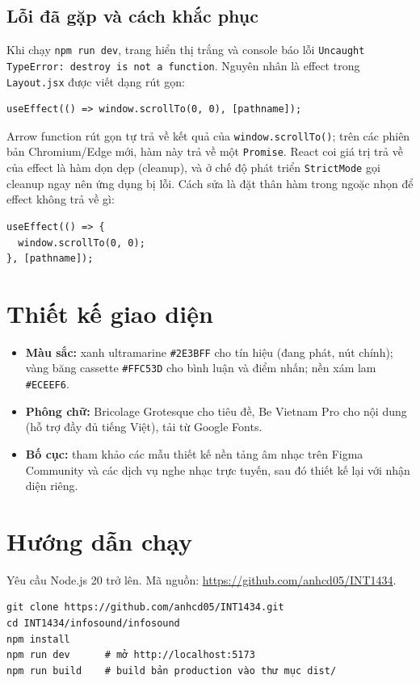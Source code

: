 \documentclass[12pt,a4paper]{article}
\begin{document}
\subsection{Lỗi đã gặp và cách khắc phục}

Khi chạy \texttt{npm run dev}, trang hiển thị trắng và console báo lỗi \texttt{Uncaught TypeError: destroy is not a function}. Nguyên nhân là effect trong \texttt{Layout.jsx} được viết dạng rút gọn:

\begin{verbatim}
useEffect(() => window.scrollTo(0, 0), [pathname]);
\end{verbatim}

Arrow function rút gọn tự trả về kết quả của \texttt{window.scrollTo()}; trên các phiên bản Chromium/Edge mới, hàm này trả về một \texttt{Promise}. React coi giá trị trả về của effect là hàm dọn dẹp (cleanup), và ở chế độ phát triển \texttt{StrictMode} gọi cleanup ngay nên ứng dụng bị lỗi. Cách sửa là đặt thân hàm trong ngoặc nhọn để effect không trả về gì:

\begin{verbatim}
useEffect(() => {
  window.scrollTo(0, 0);
}, [pathname]);
\end{verbatim}

\section{Thiết kế giao diện}

\begin{itemize}
  \item \textbf{Màu sắc:} xanh ultramarine \texttt{\#2E3BFF} cho tín hiệu (đang phát, nút chính); vàng băng cassette \texttt{\#FFC53D} cho bình luận và điểm nhấn; nền xám lam \texttt{\#ECEEF6}.
  \item \textbf{Phông chữ:} Bricolage Grotesque cho tiêu đề, Be Vietnam Pro cho nội dung (hỗ trợ đầy đủ tiếng Việt), tải từ Google Fonts.
  \item \textbf{Bố cục:} tham khảo các mẫu thiết kế nền tảng âm nhạc trên Figma Community và các dịch vụ nghe nhạc trực tuyến, sau đó thiết kế lại với nhận diện riêng.
\end{itemize}

\section{Hướng dẫn chạy}

Yêu cầu Node.js 20 trở lên. Mã nguồn: \url{https://github.com/anhcd05/INT1434}.
\begin{verbatim}
git clone https://github.com/anhcd05/INT1434.git
cd INT1434/infosound/infosound
npm install
npm run dev      # mở http://localhost:5173
npm run build    # build bản production vào thư mục dist/
\end{verbatim}
\end{document}
